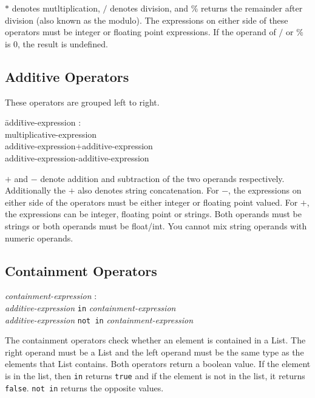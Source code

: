 \documentclass{article}
\begin{document}
$*$ denotes mutltiplication, $/$ denotes division, and $\%$ returns the remainder after division (also known as the modulo). The expressions on either side of these operators must be integer or floating point expressions. If the operand of $/$ or $\%$ is 0, the result is undefined.

\subsection{Additive Operators}
These operators are grouped left to right.
\begin{itshape}
\begin{tabbing}
	\= addi\=tive-expression : \\
		\> \> multiplicative-expression \\
		\>\> additive-expression+additive-expression \\		
		\>\> additive-expression-additive-expression
\end{tabbing}
\end{itshape}

$+$ and $-$ denote addition and subtraction of the two operands respectively. Additionally the $+$ also denotes string concatenation. For $-$, the expressions on either side of the operators must be either integer or floating point valued. For $+$, the expressions can be integer, floating point or strings. Both operands must be strings or both operands must be float/int. You cannot mix string operands with numeric operands.

\subsection{Containment Operators}
\begin{tabbing}
	\= \emph{cont}\=\emph{ainment-expression} : \\
		\>\> \emph{additive-expression} \texttt{in} \emph{containment-expression} \\	
		\>\> \emph{additive-expression} \texttt{not in} \emph{containment-expression} 
\end{tabbing}
The containment operators check whether an element is contained in a List. The right operand must be a List and the left operand must be the same type as the elements that List contains. Both operators return a boolean value. If the element is in the list, then \texttt{in} returns \texttt{true} and if the element is not in the list, it returns \texttt{false}. \texttt{not in} returns the opposite values.
\end{document}
